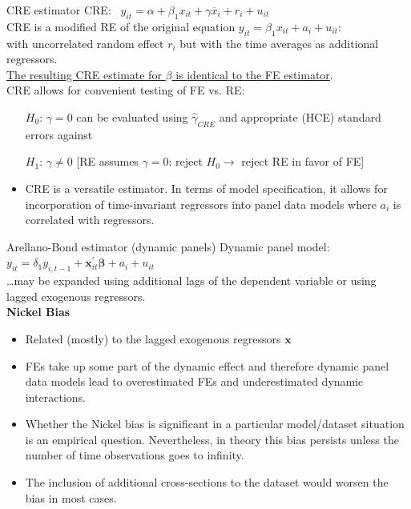 \documentclass[usenames,dvipsnames]{beamer}
\begin{document}
\begin{frame}{CRE estimator}
CRE: \ $y_{it} = \alpha + \beta_1 x_{it} + \gamma \overline{x}_i + r_i + u_{it}$ \\
\medskip
\small CRE is a modified RE of the original equation $y_{it} =  \beta_1 x_{it} + a_i + u_{it}$: \\
\vspace{0.2cm}
with uncorrelated random effect $r_i$ but with the time averages as additional regressors. \\
\vspace{0.3cm}
\underline{The resulting CRE estimate for $\beta$ is identical to the FE estimator}. \\ \medskip
CRE allows for convenient testing of FE vs. RE:
	\begin{itemize}
	\item[$H_0$:] $\gamma = 0$ can be evaluated using $\hat{\gamma}_{\textit{CRE}}$ and appropriate (HCE) standard errors against
	\item[$H_1$:] $\gamma \neq 0$ [RE assumes $\gamma = 0$: reject $H_0\rightarrow$ reject RE in favor of FE]
	\end{itemize}

\begin{itemize}
    \item CRE is a versatile estimator. In terms of model specification, it allows for incorporation of time-invariant regressors into panel data models where $a_i$ is correlated with regressors.
\end{itemize}
\end{frame}
\begin{frame}{Arellano-Bond estimator (dynamic panels)}
Dynamic panel model:\\
\medskip
$y_{it} = \delta_1 y_{i,t-1} + \bm{x}^{\prime}_{it} \bm{\beta} + a_i + u_{it}$\\
\medskip
\dots may be expanded using additional lags of the dependent variable or using lagged exogenous regressors.\\
\medskip
\small
\textbf{Nickel Bias}
\begin{itemize}
\item Related (mostly) to the lagged exogenous regressors $\bm{x}$
\item FEs take up some part of the dynamic effect and therefore dynamic panel data models lead to overestimated FEs and underestimated dynamic interactions. 
\item Whether the Nickel bias is significant in a particular model/dataset situation is an empirical question. Nevertheless, in theory this bias persists unless the number of time observations goes to infinity.
\item The inclusion of additional cross-sections to the dataset would worsen the bias in most cases.
\end{itemize}
\end{frame}
\end{document}
